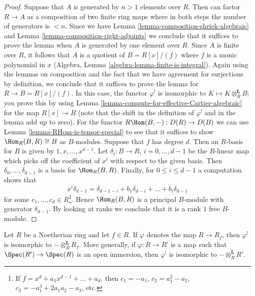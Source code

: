 \begin{proof}
Suppose that $A$ is generated by $n > 1$ elements over $R$.
Then can factor $R \to A$ as a composition of two finite ring maps
where in both steps the number of generators is $< n$.
Since we have Lemma \ref{lemma-composition-shriek-algebraic} and
Lemma \ref{lemma-composition-right-adjoints}
we conclude that it suffices
to prove the lemma when $A$ is generated by one element over $R$.
Since $A$ is finite over $R$, it follows that $A$ is a quotient
of $B = R[x]/(f)$ where $f$ is a monic polynomial in $x$
(Algebra, Lemma \ref{algebra-lemma-finite-is-integral}).
Again using the lemmas on composition and the fact that we
have agreement for surjections by definition, we conclude that
it suffices to prove the lemma for $R \to B = R[x]/(f)$.
In this case, the functor $\varphi^!$ is isomorphic to
$K \mapsto K \otimes_R^\mathbf{L} B$; you prove this by
using Lemma \ref{lemma-compute-for-effective-Cartier-algebraic}
for the map $R[x] \to B$ (note that the shift in the definition
of $\varphi^!$ and in the lemma add up to zero).
For the functor $R\Hom(B, -) : D(R) \to D(B)$ we can use
Lemma \ref{lemma-RHom-is-tensor-special}
to see that it suffices to show $\Hom_R(B, R) \cong B$
as $B$-modules. Suppose that $f$ has degree $d$.
Then an $R$-basis for $B$ is given by $1, x, \ldots, x^{d - 1}$.
Let $\delta_i : B \to R$, $i = 0, \ldots, d - 1$
be the $R$-linear map which picks off the coefficient
of $x^i$ with respect to the given basis. Then
$\delta_0, \ldots, \delta_{d - 1}$ is a basis for $\Hom_R(B, R)$.
Finally, for $0 \leq i \leq d - 1$ a computation shows that
$$
x^i \delta_{d - 1} =
\delta_{d - 1 - i} + b_1 \delta_{d - i} + \ldots + b_i \delta_{d - 1}
$$
for some $c_1, \ldots, c_d \in R$\footnote{If
$f = x^d + a_1 x^{d - 1} + \ldots + a_d$, then
$c_1 = -a_1$, $c_2 = a_1^2 - a_2$, $c_3 = -a_1^3 + 2a_1a_2 -a_3$, etc.}.
Hence $\Hom_R(B, R)$ is a principal $B$-module with generator
$\delta_{d - 1}$. By looking
at ranks we conclude that it is a rank $1$ free $B$-module.
\end{proof}

\begin{lemma}
\label{lemma-upper-shriek-localize}
Let $R$ be a Noetherian ring and let $f \in R$.
If $\varphi$ denotes the map $R \to R_f$, then $\varphi^!$
is isomorphic to $- \otimes_R^\mathbf{L} R_f$.
More generally, if $\varphi : R \to R'$ is a map such that
$\Spec(R') \to \Spec(R)$ is an open immersion, then
$\varphi^!$ is isomorphic to $- \otimes_R^\mathbf{L} R'$.
\end{lemma}


